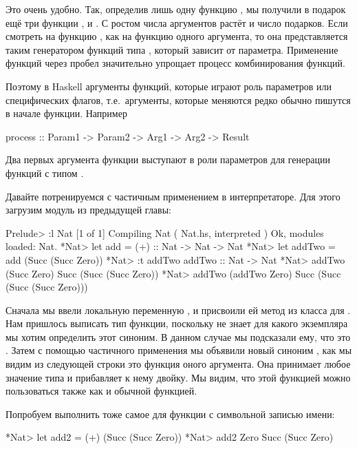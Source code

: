 Это очень удобно. Так, определив лишь одну функцию ,
мы получили в подарок ещё три функции , 
 и . С ростом числа аргументов растёт
и число подарков. Если смотреть
на функцию , как на функцию одного аргумента, то 
она представляется таким генератором функций типа ,
который зависит от параметра. Применение функций через пробел
значительно упрощает процесс комбинирования функций.

Поэтому в Haskell аргументы функций, которые играют роль 
параметров или специфических флагов, т.е.~аргументы, которые
меняются редко обычно пишутся в начале функции.  Например

\begin{code}
process :: Param1 -> Param2 -> Arg1 -> Arg2 -> Result
\end{code}

Два первых аргумента функции  выступают в роли параметров
для генерации функций с типом .

Давайте потренируемся с частичным применением в интерпретаторе.
Для этого загрузим модуль  из предыдущей главы:

\begin{code}
Prelude> :l Nat
[1 of 1] Compiling Nat              ( Nat.hs, interpreted )
Ok, modules loaded: Nat.
*Nat> let add = (+) :: Nat -> Nat -> Nat
*Nat> let addTwo = add (Succ (Succ Zero))
*Nat> :t addTwo
addTwo :: Nat -> Nat
*Nat> addTwo (Succ Zero)
Succ (Succ (Succ Zero))
*Nat> addTwo (addTwo Zero)
Succ (Succ (Succ (Succ Zero)))
\end{code}

Сначала мы ввели локальную переменную , и
присвоили ей метод \In{(+)} из класса  для .
Нам пришлось выписать тип функции, поскольку  
не знает для какого экземпляра мы хотим определить этот синоним.
В данном случае мы подсказали ему, что это . 
Затем с помощью частичного применения мы объявили новый
синоним , как мы видим из следующей строки
это функция оного аргумента. Она принимает любое значение
типа  и прибавляет к нему двойку. Мы видим, что
этой функцией можно пользоваться также как и обычной функцией.

Попробуем выполнить тоже самое для функции с символьной записью имени:

\begin{code}
*Nat> let add2 = (+) (Succ (Succ Zero))
*Nat> add2 Zero
Succ (Succ Zero)
\end{code}

